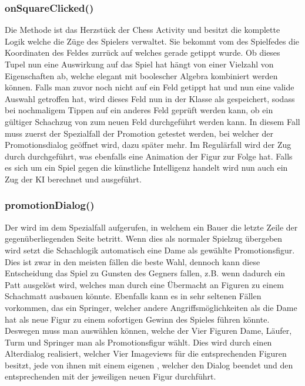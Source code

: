 \subsubsection{onSquareClicked()}

Die Methode  ist das Herzstück der Chess Activity und
besitzt die komplette Logik welche die Züge des Spielers verwaltet. Sie bekommt
vom  des Spielfedes die Koordinaten des Feldes zurrück auf
welches gerade getippt wurde. Ob dieses Tupel nun eine Auswirkung auf das Spiel
hat hängt von einer Vielzahl von Eigenschaften ab, welche elegant mit boolescher
Algebra kombiniert werden können. Falls man zuvor noch nicht auf ein Feld
getippt hat und nun eine valide Auswahl getroffen hat, wird dieses Feld nun in
der Klasse als  gespeichert, sodass bei nochmaligem Tippen auf ein
anderes Feld geprüft werden kann, ob ein gültiger Schachzug von 
zum neuen Feld durchgeführt werden kann. In diesem Fall muss zuerst der
Spezialfall der Promotion getestet werden, bei welcher der Promotionsdialog
geöffnet wird, dazu später mehr. Im Regulärfall wird der Zug durch
 durchgeführt, was ebenfalls eine Animation der Figur zur
Folge hat. Falls es sich um ein Spiel gegen die künstliche Intelligenz handelt
wird nun auch ein Zug der KI berechnet und ausgeführt.

\subsubsection{promotionDialog()}
Der  wird im dem Spezialfall aufgerufen, in welchem ein 
Bauer die letzte Zeile der gegenüberliegenden Seite betritt. Wenn dies als 
normaler Spielzug übergeben wird setzt die Schachlogik automatisch eine Dame als 
gewählte Promotionsfigur. Dies ist zwar in den meisten fällen die beste Wahl, 
dennoch kann diese Entscheidung das Spiel zu Gunsten des Gegners fallen, z.B. 
wenn dadurch ein Patt ausgelöst wird, welches man durch eine Übermacht an 
Figuren zu einem Schachmatt ausbauen könnte. Ebenfalls kann es in sehr seltenen 
Fällen vorkommen, das ein Springer, welcher andere Angriffsmöglichkeiten als die 
Dame hat als neue Figur zu einem sofortigen Gewinn des Spieles führen könnte. 
Deswegen muss man auswählen können, welche der Vier Figuren Dame, Läufer, Turm 
und Springer man als Promotionsfigur wählt. Dies wird durch einen Alterdialog 
realisiert, welcher Vier Imageviews für die entsprechenden Figuren besitzt, jede 
von ihnen mit einem eigenen , welcher den Dialog 
beendet und den entsprechenden   mit der jeweiligen neuen 
Figur durchführt.

